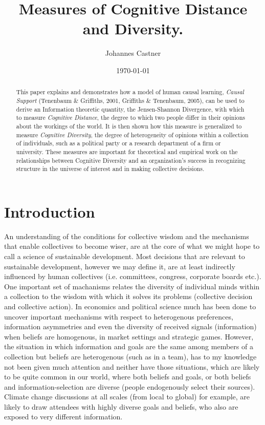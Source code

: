 \documentclass[11pt]{article}
\title{Measures of Cognitive Distance and Diversity.}
\author{Johannes Castner}
\date{\today}
\begin{document}
\maketitle

\setcounter{tocdepth}{3}
\tableofcontents
\vspace*{1cm}


\newpage

\begin{abstract}
This paper explains and demonstrates how a model of human causal learning, \emph{Causal Support} (Tenenbaum \& Griffiths, 2001, Griffiths \& Tenenbaum, 2005), can be used to derive an Information theoretic quantity, the Jensen-Shannon Divergence, with which to measure \emph{Cognitive Distance}, the degree to which two people differ in their opinions about the workings of the world. It is then shown how this measure is generalized to measure \emph{Cognitive Diversity}, the degree of heterogeneity of opinions within a collection of individuals, such as a political party or a research department of a firm or university. These measures are important for theoretical and empirical work on the relationships between Cognitive Diversity and an organization's success in recognizing structure in the universe of interest and in making collective decisions.
\end{abstract}

\newpage

\section{Introduction}
\label{sec-1}


An understanding of the conditions for collective wisdom and the mechanisms that enable collectives to become wiser, are at the core of what we might hope to call a science of sustainable development. Most decisions that are relevant to sustainable development, however we may define it, are at least indirectly influenced by human collectives (i.e. committees, congress, corporate boards etc.). One important set of machanisms relates the diversity of individual minds within a collection to the wisdom with which it solves its problems (collective decision and collective action). In economics and political science much has been done to uncover important mechanisms with respect to heterogenous preferences, information asymmetries and even the diversity of received signals (information) when beliefs are homogenous, in market settings and strategic games. However, the situation in which information and goals are the same among members of a collection but beliefs are heterogenous (such as in a team), has to my knowledge not been given much attention and neither have those situations, which are likely to be quite common in our world, where both beliefs and goals, or both beliefs and information-selection are diverse (people endogenously select their sources). Climate change discussions at all scales (from local to global) for example, are likely to draw attendees with highly diverse goals and beliefs, who also are exposed to very different information.
\end{document}
